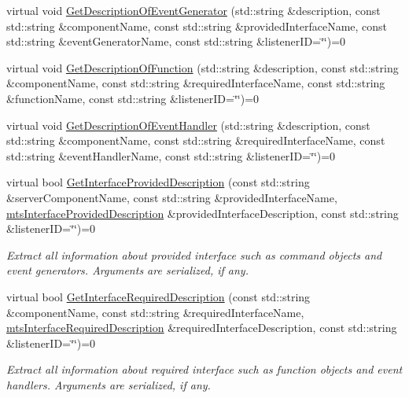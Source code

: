 \begin{DoxyCompactItemize}
\item 
virtual void \hyperlink{classmts_manager_local_interface_a96d45da8fb3ece61b6c99504c74df114}{Get\+Description\+Of\+Event\+Generator} (std\+::string \&description, const std\+::string \&component\+Name, const std\+::string \&provided\+Interface\+Name, const std\+::string \&event\+Generator\+Name, const std\+::string \&listener\+I\+D=\char`\"{}\char`\"{})=0
\item 
virtual void \hyperlink{classmts_manager_local_interface_a70d67480d63eafe650906d87a255f612}{Get\+Description\+Of\+Function} (std\+::string \&description, const std\+::string \&component\+Name, const std\+::string \&required\+Interface\+Name, const std\+::string \&function\+Name, const std\+::string \&listener\+I\+D=\char`\"{}\char`\"{})=0
\item 
virtual void \hyperlink{classmts_manager_local_interface_acf03d1240b5f0ba5637cd32fdd03ecaa}{Get\+Description\+Of\+Event\+Handler} (std\+::string \&description, const std\+::string \&component\+Name, const std\+::string \&required\+Interface\+Name, const std\+::string \&event\+Handler\+Name, const std\+::string \&listener\+I\+D=\char`\"{}\char`\"{})=0
\item 
virtual bool \hyperlink{classmts_manager_local_interface_a2a3db8231dd1d120d07352f90c55abd9}{Get\+Interface\+Provided\+Description} (const std\+::string \&server\+Component\+Name, const std\+::string \&provided\+Interface\+Name, \hyperlink{classmts_interface_provided_description}{mts\+Interface\+Provided\+Description} \&provided\+Interface\+Description, const std\+::string \&listener\+I\+D=\char`\"{}\char`\"{})=0
\begin{DoxyCompactList}\small\item\em Extract all information about provided interface such as command objects and event generators. Arguments are serialized, if any. \end{DoxyCompactList}\item 
virtual bool \hyperlink{classmts_manager_local_interface_a3010191948ef1402d231eb94af75b51b}{Get\+Interface\+Required\+Description} (const std\+::string \&component\+Name, const std\+::string \&required\+Interface\+Name, \hyperlink{classmts_interface_required_description}{mts\+Interface\+Required\+Description} \&required\+Interface\+Description, const std\+::string \&listener\+I\+D=\char`\"{}\char`\"{})=0
\begin{DoxyCompactList}\small\item\em Extract all information about required interface such as function objects and event handlers. Arguments are serialized, if any. \end{DoxyCompactList}\end{DoxyCompactItemize}


